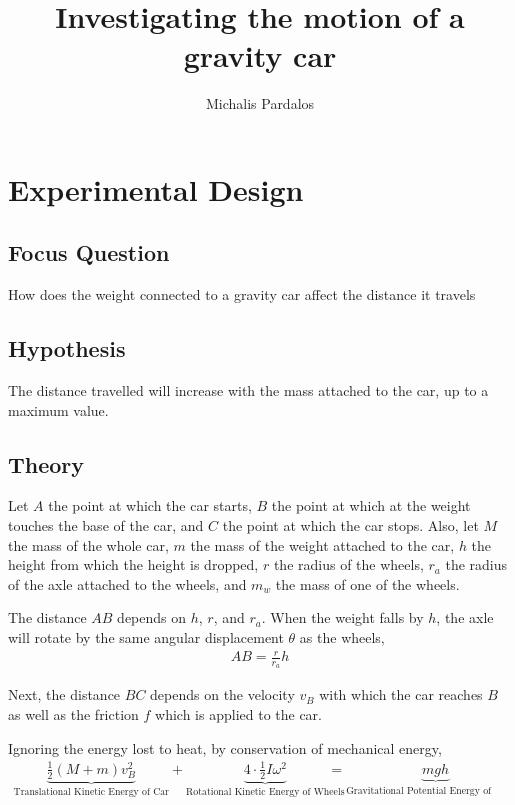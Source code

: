 \documentclass[titlepage,12pt]{article}
\title{Investigating the motion of a gravity car}
\author{Michalis Pardalos}
\date{}
\begin{document}
\maketitle
\section{Experimental Design}

    \subsection{Focus Question}
        How does the weight connected to a gravity car affect the distance it
        travels

    \subsection{Hypothesis}
        The distance travelled will increase with the mass attached to the car, up to a
        maximum value.

    \subsection{Theory}
        Let $A$ the point at which the car starts, $B$ the point at which at the weight
        touches the base of the car, and $C$ the point at which the car stops. Also, let $M$
        the mass of the whole car, $m$ the mass of the weight attached to the car, $h$ the
        height from which the height is dropped, $r$ the radius of the wheels, $r_a$ the
        radius of the axle attached to the wheels, and $m_w$ the mass of one of the wheels.

        The distance $AB$ depends on $h$, $r$, and $r_a$. When the weight falls by $h$, the
        axle will rotate by the same angular displacement $\theta$ as the wheels, 
        \begin{align*}
            AB = \frac{r}{r_a} h
        \end{align*}

        Next, the distance $BC$ depends on the velocity $v_B$ with which the car reaches
        $B$ as well as the friction $f$ which is applied to the car. 

        Ignoring the energy lost to heat, by conservation of mechanical energy,
        \begin{align*}
            \underbrace{\frac{1}{2}(M+m)v_B^2}_{\text{Translational Kinetic Energy of Car}} +
            \underbrace{4\cdot\frac{1}{2}I\omega^2}_{\text{Rotational Kinetic Energy of Wheels}} &=
            \underbrace{mgh}_{\text{Gravitational Potential Energy of Weight}}
        \end{align*}
\end{document}

